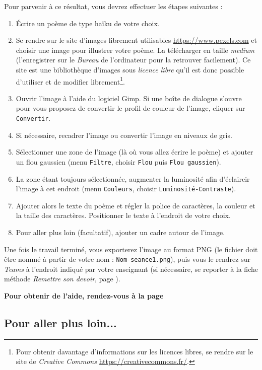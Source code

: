 {Pour parvenir à ce résultat, vous devrez effectuer les étapes suivantes :
\begin{enumerate}
\item Écrire un poème de type haïku de votre choix.
\item Se rendre sur le site d'images librement utilisables \url{https://www.pexels.com} et choisir une image pour illustrer votre poème. La télécharger en taille \emph{medium} (l'enregistrer sur le \emph{Bureau} de l'ordinateur pour la retrouver facilement). Ce site est une bibliothèque d'images sous \emph{licence libre} qu'il est donc possible d'utiliser et de modifier librement\footnote{Pour obtenir davantage d'informations sur les licences libres, se rendre sur le site de \emph{Creative Commons} \url{https://creativecommons.fr/}.}.
\item Ouvrir l'image à l'aide du logiciel Gimp. Si une boîte de dialogue s'ouvre pour vous proposez de convertir le profil de couleur de l'image, cliquer sur \texttt{Convertir}.
\item Si nécessaire, recadrer l'image ou convertir l'image en niveaux de gris.
\item Sélectionner une zone de l'image (là où vous allez écrire le poème) et ajouter un flou gaussien (menu \texttt{Filtre}, choisir \texttt{Flou} puis \texttt{Flou gaussien}).   
\item La zone étant toujours sélectionnée, augmenter la luminosité afin d'éclaircir l'image à cet endroit (menu \texttt{Couleurs}, choisir \texttt{Luminosité-Contraste}). 
\item Ajouter alors le texte du poème et régler la police de caractères, la couleur et la taille des caractères. Positionner le texte à l'endroit de votre choix.
\item Pour aller plus loin (facultatif), ajouter un cadre autour de l'image.
\end{enumerate}
Une fois le travail terminé, vous exporterez l'image au format PNG (le fichier doit être nommé à partir de votre nom : \texttt{Nom-seance1.png}), puis vous le rendrez sur \emph{Teams} à l'endroit indiqué par votre enseignant (si nécessaire, se reporter à la fiche méthode \emph{Remettre son devoir}, page \pageref{TeamsRemettreDevoir}).}

\textbf{Pour obtenir de l'aide, rendez-vous à la page \pageref{Image5eOutils}}

\subsection{Pour aller plus loin...}

